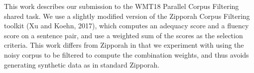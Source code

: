 This work describes our submission to the WMT18 Parallel Corpus Filtering shared task. We use a slightly modified version of the Zipporah Corpus Filtering toolkit (Xu and Koehn, 2017), which computes an adequacy score and a fluency score on a sentence pair, and use a weighted sum of the scores as the selection criteria. This work differs from Zipporah in that we experiment with using the noisy corpus to be filtered to compute the combination weights, and thus avoids generating synthetic data as in standard Zipporah.
